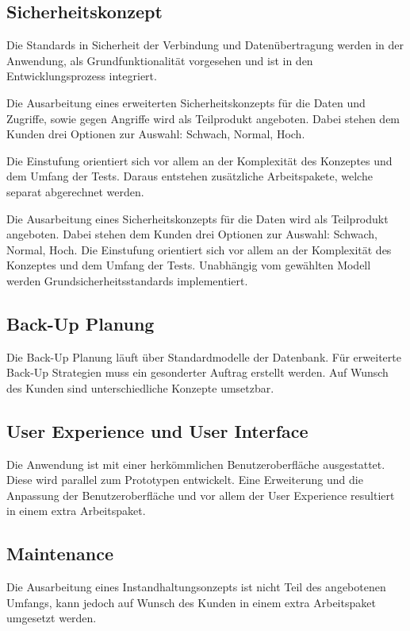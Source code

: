 	\subsection{Sicherheitskonzept}
	Die Standards in Sicherheit der Verbindung und Datenübertragung werden in der Anwendung, als Grundfunktionalität vorgesehen und ist in den Entwicklungsprozess integriert.
	

	Die Ausarbeitung eines erweiterten Sicherheitskonzepts für die Daten und Zugriffe, sowie gegen Angriffe wird als Teilprodukt angeboten. Dabei stehen dem Kunden drei Optionen zur Auswahl: Schwach, Normal, Hoch. 
	
	Die Einstufung orientiert sich vor allem an der Komplexität des Konzeptes und dem Umfang der Tests. Daraus entstehen zusätzliche Arbeitspakete, welche separat abgerechnet werden. 
	

	Die Ausarbeitung eines Sicherheitskonzepts für die Daten wird als Teilprodukt angeboten. Dabei stehen dem Kunden drei Optionen zur Auswahl: Schwach, Normal, Hoch. 
	Die Einstufung orientiert sich vor allem an der Komplexität des Konzeptes und dem Umfang der Tests. \newline	
	Unabhängig vom gewählten Modell werden  Grundsicherheitsstandards implementiert.

	\subsection{Back-Up Planung}
	
	Die Back-Up Planung läuft über Standardmodelle der Datenbank. Für erweiterte Back-Up Strategien muss ein gesonderter Auftrag erstellt werden. Auf Wunsch des Kunden sind unterschiedliche Konzepte umsetzbar.
	
	\subsection{User Experience und User Interface}
	
	Die Anwendung ist mit einer herkömmlichen Benutzeroberfläche ausgestattet. Diese wird parallel zum Prototypen entwickelt. Eine Erweiterung und die Anpassung der Benutzeroberfläche und vor allem der User Experience resultiert in einem extra Arbeitspaket.
	
	
	\subsection{Maintenance}
	
	Die Ausarbeitung eines Instandhaltungsonzepts ist nicht Teil des angebotenen Umfangs, kann jedoch auf Wunsch des Kunden in einem extra Arbeitspaket umgesetzt werden.
	
